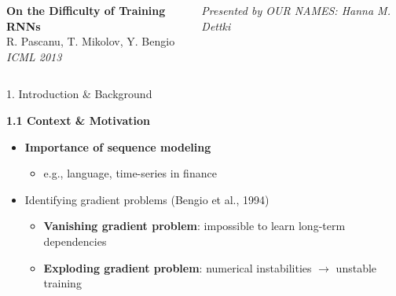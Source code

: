 \begin{frame}[t]
    \begin{columns}[t,totalwidth=\textwidth]
    \begin{column}{0.66\textwidth}
      \vspace{1em}
      {\centering
        {\veryHuge\bfseries On the Difficulty of Training RNNs}\\[0.5em]
        {\Huge R. Pascanu, T. Mikolov, Y. Bengio}\\[0.5em]
        {\Large\itshape ICML 2013}\\
      }
    \end{column}
    \begin{column}{0.33\textwidth}
      \flushright
      \Large \textit{Presented by OUR NAMES: Hanna M. Dettki}
    \end{column}
  \end{columns}
  \vspace{2em}

  \begin{columns}[t,totalwidth=\textwidth]

    \begin{column}{0.33\textwidth}
      \begin{block}{1. Introduction \& Background} \todo{}

        \textbf{1.1 Context \& Motivation}
            \begin{itemize}
            \item \textbf{Importance of sequence modeling}
            \begin{itemize}
                \item e.g., language, time-series in finance
            \end{itemize}

            \item Identifying gradient problems (Bengio et al., 1994)
            \begin{itemize}
                \item \textbf{Vanishing gradient problem}: impossible to learn long-term dependencies
                \item \textbf{Exploding gradient problem}: numerical instabilities $\rightarrow$ unstable training
            \end{itemize}


\end{itemize}
\end{block}
\end{column}
\end{columns}
\end{frame}
